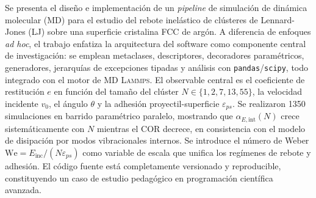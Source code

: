 Se presenta el diseño e implementación de un \textit{pipeline} de simulación de
dinámica molecular (MD) para el estudio del rebote inelástico de clústeres de
Lennard-Jones (LJ) sobre una superficie cristalina FCC de argón. A diferencia
de enfoques \textit{ad hoc}, el trabajo enfatiza la arquitectura del software
como componente central de investigación: se emplean metaclases, descriptores,
decoradores paramétricos, generadores, jerarquías de excepciones tipadas y
análisis con \texttt{pandas}/\texttt{scipy}, todo integrado con el motor de MD
\textsc{Lammps}. El observable central es el coeficiente de restitución $e$ en
función del tamaño del clúster $N \in \{1, 2, 7, 13, 55\}$, la velocidad
incidente $v_0$, el ángulo $\theta$ y la adhesión proyectil-superficie
$\varepsilon_{ps}$. Se realizaron \num{1350} simulaciones en barrido paramétrico
paralelo, mostrando que $\alpha_{E,\mathrm{int}}(N)$ crece sistemáticamente con
$N$ mientras el COR decrece, en consistencia con el modelo de disipación por
modos vibracionales internos. Se introduce el número de Weber
$\mathrm{We} = E_{\mathrm{inc}}/(N\varepsilon_{ps})$ como variable de escala
que unifica los regímenes de rebote y adhesión. El código fuente está
completamente versionado y reproducible, constituyendo un caso de estudio
pedagógico en programación científica avanzada.
